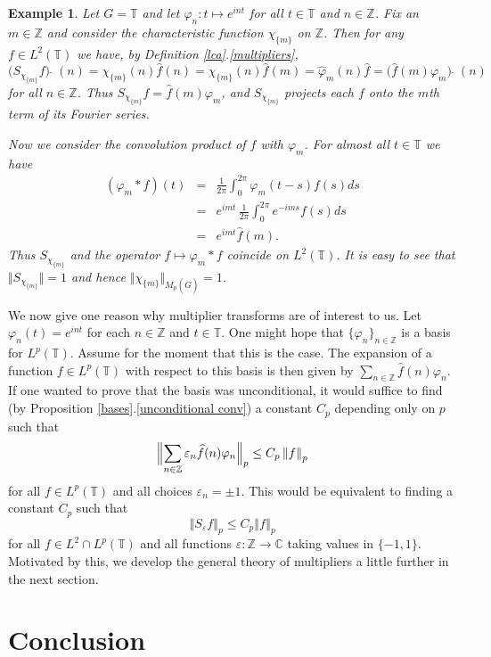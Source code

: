 \documentclass[mmath,12pt]{unswthesis}   %
\newcommand{\C}{\mathbb{C}}
\newcommand{\T}{\mathbb{T}}
\newcommand{\Z}{\mathbb{Z}}
\newcommand{\hatt}[1]{\widehat #1}
\newcommand{\reff}[2]{\ref{#1}.\ref{#2}}
\def\norm#1{\left \Vert #1 \right \Vert}
\def\snorm#1{\Bigl \Vert #1 \Bigr \Vert}
\def\ssnorm#1{\Vert #1 \Vert}
\newtheorem{example}[theorem]{Example}
\numberwithin{equation}{section}
\begin{document}
\begin{example}\label{lca example}
Let $G=\T$ and let $\varphi_n:t\mapsto e^{int}$ for all $t\in\T$ and $n\in\Z$.
Fix an $m\in\Z$ 
and consider the characteristic function $\chi_{\{m\}}$ on $\Z$.
Then for any $f\in L^2(\T)$ we have, by Definition \reff{lca}{multipliers},
\[\bigl(S_{\chi_{\{m\}}}f\bigr)\,\hatt{\,}\,(n)=\chi_{\{m\}}(n)\hatt{f}(n)
=\chi_{\{m\}}(n)\hatt{f}(m)=\hatt{\varphi}_m(n)\hatt{f}=
\bigl(\hatt{f}(m)\varphi_m\bigr)\,\hatt{\,}\,(n)\]
for all $n\in\Z$. Thus $S_{\chi_{\{m\}}}f=\hatt{f}(m)\varphi_m$, and
$S_{\chi_{\{m\}}}$ projects each $f$ onto the $m$th term of its Fourier
series.

Now we consider the convolution product of $f$ with $\varphi_m$.
For almost all $t\in\T$ we have
\begin{eqnarray*}
(\varphi_m*f)(t) &=& \frac{1}{2\pi}\int_0^{2\pi}\varphi_m(t-s)f(s)ds \\
& = & e^{imt}\,\frac{1}{2\pi}\int_0^{2\pi}e^{-ims}f(s)ds \\
& = & e^{imt}\hatt{f}(m).
\end{eqnarray*}
Thus $S_{\chi_{\{m\}}}$ and the operator $f\mapsto\varphi_m*f$ coincide on
$L^2(\T)$. It is easy to see that $\ssnorm{S_{\chi_{\{m\}}}}=1$ and hence
$\ssnorm{\chi_{\{m\}}}_{M_p(\hatt{G})}=1$.
\end{example}

We now give one reason why multiplier transforms are of interest to us.
Let $\varphi_n(t)=e^{int}$ for each $n\in\Z$ and $t\in\T$. One might hope that
$\{\varphi_n\}_{n\in\Z}$ is a basis for $L^p(\T)$. Assume for the moment that 
this is the case. The expansion of a
function $f\in L^p(\T)$ with respect to this basis is then given by
$\sum_{n\in\Z}\hatt{f}(n)\varphi_n$. 
If one wanted to prove that the basis was unconditional, it would suffice to
find (by Proposition \reff{bases}{unconditional conv}) a constant $C_p$
depending only on $p$ such that
\[\snorm{\sum_{n\in\Z}\varepsilon_n\hatt{f}(n)\varphi_n}_p\leq C_p\norm{f}_p\]
for all $f\in L^p(\T)$ and all choices
$\varepsilon_n=\pm 1$. This would be
equivalent to finding a constant $C_p$ such that
\[\norm{S_{\varepsilon}f}_p\leq C_p\norm{f}_p\]
for all $f\in L^2\cap L^p(\T)$ and all functions $\varepsilon:\Z\rightarrow\C$
taking values in $\{-1,1\}$. Motivated by this, we develop the general theory of
multipliers a little further in the next section.

\chapter{Conclusion}\label{ccl}
\end{document}
